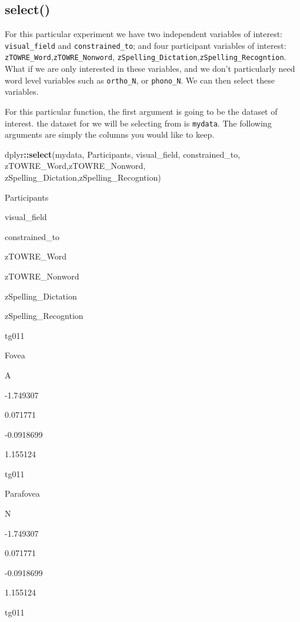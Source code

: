 \documentclass[]{book}
\newenvironment{Shaded}{\begin{snugshade}}{\end{snugshade}}
\newcommand{\KeywordTok}[1]{\textcolor[rgb]{0.13,0.29,0.53}{\textbf{#1}}}
\newcommand{\OperatorTok}[1]{\textcolor[rgb]{0.81,0.36,0.00}{\textbf{#1}}}
\newcommand{\NormalTok}[1]{#1}
\begin{document}
\subsection{select()}\label{select}

For this particular experiment we have two independent variables of
interest: \texttt{visual\_field} and \texttt{constrained\_to}; and four
participant variables of interest:
\texttt{zTOWRE\_Word},\texttt{zTOWRE\_Nonword},
\texttt{zSpelling\_Dictation},\texttt{zSpelling\_Recogntion}. What if we
are only interested in these variables, and we don't particularly need
word level variables such as \texttt{ortho\_N}, or \texttt{phono\_N}. We
can then select these variables.

For this particular function, the first argument is going to be the
dataset of interest. the dataset for we will be selecting from is
\texttt{mydata}. The following arguments are simply the columns you
would like to keep.

\begin{Shaded}
\begin{Highlighting}[]
\NormalTok{dplyr}\OperatorTok{::}\KeywordTok{select}\NormalTok{(mydata, Participants, visual_field, constrained_to, zTOWRE_Word,zTOWRE_Nonword,   zSpelling_Dictation,zSpelling_Recogntion)}
\end{Highlighting}
\end{Shaded}

Participants

visual\_field

constrained\_to

zTOWRE\_Word

zTOWRE\_Nonword

zSpelling\_Dictation

zSpelling\_Recogntion

tg011

Fovea

A

-1.749307

0.071771

-0.0918699

1.155124

tg011

Parafovea

N

-1.749307

0.071771

-0.0918699

1.155124

tg011
\end{document}

